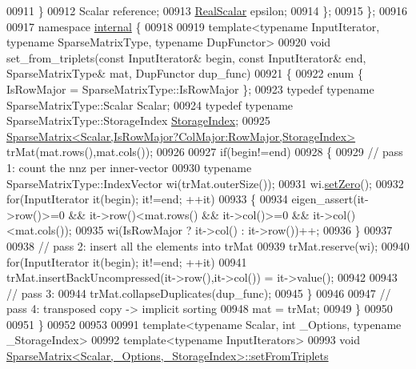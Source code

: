 \begin{DoxyCode}
00911     \}
00912     Scalar reference;
00913     \hyperlink{group___sparse_core___module_aaec8ace6efb785c81d442931c3248d88}{RealScalar} epsilon;
00914   \};
00915 \};
00916 
00917 \textcolor{keyword}{namespace }\hyperlink{namespaceinternal}{internal} \{
00918 
00919 \textcolor{keyword}{template}<\textcolor{keyword}{typename} InputIterator, \textcolor{keyword}{typename} SparseMatrixType, \textcolor{keyword}{typename} DupFunctor>
00920 \textcolor{keywordtype}{void} set\_from\_triplets(\textcolor{keyword}{const} InputIterator& begin, \textcolor{keyword}{const} InputIterator& end, SparseMatrixType& mat, 
      DupFunctor dup\_func)
00921 \{
00922   \textcolor{keyword}{enum} \{ IsRowMajor = SparseMatrixType::IsRowMajor \};
00923   \textcolor{keyword}{typedef} \textcolor{keyword}{typename} SparseMatrixType::Scalar Scalar;
00924   \textcolor{keyword}{typedef} \textcolor{keyword}{typename} SparseMatrixType::StorageIndex \hyperlink{group___sparse_core___module_a0b540ba724726ebe953f8c0df06081ed}{StorageIndex};
00925   \hyperlink{group___sparse_core___module_class_eigen_1_1_sparse_matrix}{SparseMatrix<Scalar,IsRowMajor?ColMajor:RowMajor,StorageIndex>}
       trMat(mat.rows(),mat.cols());
00926 
00927   \textcolor{keywordflow}{if}(begin!=end)
00928   \{
00929     \textcolor{comment}{// pass 1: count the nnz per inner-vector}
00930     \textcolor{keyword}{typename} SparseMatrixType::IndexVector wi(trMat.outerSize());
00931     wi.\hyperlink{group___sparse_core___module_ad3c7416090f913e8685523cb3ab7c2f7}{setZero}();
00932     \textcolor{keywordflow}{for}(InputIterator it(begin); it!=end; ++it)
00933     \{
00934       eigen\_assert(it->row()>=0 && it->row()<mat.rows() && it->col()>=0 && it->col()<mat.cols());
00935       wi(IsRowMajor ? it->col() : it->row())++;
00936     \}
00937 
00938     \textcolor{comment}{// pass 2: insert all the elements into trMat}
00939     trMat.reserve(wi);
00940     \textcolor{keywordflow}{for}(InputIterator it(begin); it!=end; ++it)
00941       trMat.insertBackUncompressed(it->row(),it->col()) = it->value();
00942 
00943     \textcolor{comment}{// pass 3:}
00944     trMat.collapseDuplicates(dup\_func);
00945   \}
00946 
00947   \textcolor{comment}{// pass 4: transposed copy -> implicit sorting}
00948   mat = trMat;
00949 \}
00950 
00951 \}
00952 
00953 
00991 \textcolor{keyword}{template}<\textcolor{keyword}{typename} Scalar, \textcolor{keywordtype}{int} \_Options, \textcolor{keyword}{typename} \_StorageIndex>
00992 \textcolor{keyword}{template}<\textcolor{keyword}{typename} InputIterators>
00993 \textcolor{keywordtype}{void} \hyperlink{group___sparse_core___module_acc35051d698e3973f1de5b9b78dbe345}{SparseMatrix<Scalar,\_Options,\_StorageIndex>::setFromTriplets}

\end{DoxyCode}
